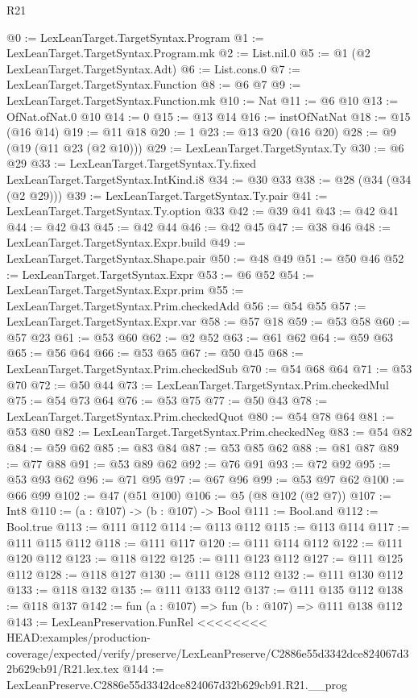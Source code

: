 \begin{lexlean}{R21}
\begin{coremodule}
{{{{{@0 := LexLeanTarget.TargetSyntax.Program
@1 := LexLeanTarget.TargetSyntax.Program.mk
@2 := List.nil.{0}
@5 := @1 (@2 LexLeanTarget.TargetSyntax.Adt)
@6 := List.cons.{0}
@7 := LexLeanTarget.TargetSyntax.Function
@8 := @6 @7
@9 := LexLeanTarget.TargetSyntax.Function.mk
@10 := Nat
@11 := @6 @10
@13 := OfNat.ofNat.{0} @10
@14 := 0
@15 := @13 @14
@16 := instOfNatNat
@18 := @15 (@16 @14)
@19 := @11 @18
@20 := 1
@23 := @13 @20 (@16 @20)
@28 := @9 (@19 (@11 @23 (@2 @10)))
@29 := LexLeanTarget.TargetSyntax.Ty
@30 := @6 @29
@33 := LexLeanTarget.TargetSyntax.Ty.fixed LexLeanTarget.TargetSyntax.IntKind.i8
@34 := @30 @33
@38 := @28 (@34 (@34 (@2 @29)))
@39 := LexLeanTarget.TargetSyntax.Ty.pair
@41 := LexLeanTarget.TargetSyntax.Ty.option @33
@42 := @39 @41
@43 := @42 @41
@44 := @42 @43
@45 := @42 @44
@46 := @42 @45
@47 := @38 @46
@48 := LexLeanTarget.TargetSyntax.Expr.build
@49 := LexLeanTarget.TargetSyntax.Shape.pair
@50 := @48 @49
@51 := @50 @46
@52 := LexLeanTarget.TargetSyntax.Expr
@53 := @6 @52
@54 := LexLeanTarget.TargetSyntax.Expr.prim
@55 := LexLeanTarget.TargetSyntax.Prim.checkedAdd
@56 := @54 @55
@57 := LexLeanTarget.TargetSyntax.Expr.var
@58 := @57 @18
@59 := @53 @58
@60 := @57 @23
@61 := @53 @60
@62 := @2 @52
@63 := @61 @62
@64 := @59 @63
@65 := @56 @64
@66 := @53 @65
@67 := @50 @45
@68 := LexLeanTarget.TargetSyntax.Prim.checkedSub
@70 := @54 @68 @64
@71 := @53 @70
@72 := @50 @44
@73 := LexLeanTarget.TargetSyntax.Prim.checkedMul
@75 := @54 @73 @64
@76 := @53 @75
@77 := @50 @43
@78 := LexLeanTarget.TargetSyntax.Prim.checkedQuot
@80 := @54 @78 @64
@81 := @53 @80
@82 := LexLeanTarget.TargetSyntax.Prim.checkedNeg
@83 := @54 @82
@84 := @59 @62
@85 := @83 @84
@87 := @53 @85 @62
@88 := @81 @87
@89 := @77 @88
@91 := @53 @89 @62
@92 := @76 @91
@93 := @72 @92
@95 := @53 @93 @62
@96 := @71 @95
@97 := @67 @96
@99 := @53 @97 @62
@100 := @66 @99
@102 := @47 (@51 @100)
@106 := @5 (@8 @102 (@2 @7))
@107 := Int8
@110 := (a : @107) -> (b : @107) -> Bool
@111 := Bool.and
@112 := Bool.true
@113 := @111 @112
@114 := @113 @112
@115 := @113 @114
@117 := @111 @115 @112
@118 := @111 @117
@120 := @111 @114 @112
@122 := @111 @120 @112
@123 := @118 @122
@125 := @111 @123 @112
@127 := @111 @125 @112
@128 := @118 @127
@130 := @111 @128 @112
@132 := @111 @130 @112
@133 := @118 @132
@135 := @111 @133 @112
@137 := @111 @135 @112
@138 := @118 @137
@142 := fun (a : @107) => fun (b : @107) => @111 @138 @112
@143 := LexLeanPreservation.FunRel
<<<<<<<< HEAD:examples/production-coverage/expected/verify/preserve/LexLeanPreserve/C2886e55d3342dce824067d32b629cb91/R21.lex.tex
@144 := LexLeanPreserve.C2886e55d3342dce824067d32b629cb91.R21.__prog
}}}}}
\end{coremodule}
\end{lexlean}
